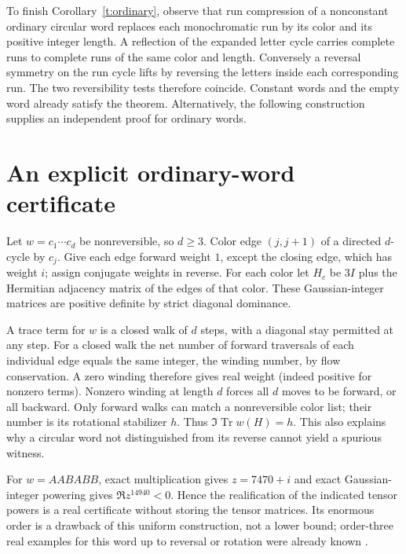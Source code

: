 \documentclass[11pt]{article}
\DeclareMathOperator{\Tr}{Tr}
\begin{document}
To finish Corollary~\ref{t:ordinary}, observe that run compression of a nonconstant ordinary circular word replaces each monochromatic run by its color and its positive integer length. A reflection of the expanded letter cycle carries complete runs to complete runs of the same color and length. Conversely a reversal symmetry on the run cycle lifts by reversing the letters inside each corresponding run. The two reversibility tests therefore coincide. Constant words and the empty word already satisfy the theorem. Alternatively, the following construction supplies an independent proof for ordinary words.

\section{An explicit ordinary-word certificate}

Let $w=c_1\cdots c_d$ be nonreversible, so $d\ge3$. Color edge $(j,j+1)$ of a directed $d$-cycle by $c_j$. Give each edge forward weight $1$, except the closing edge, which has weight $i$; assign conjugate weights in reverse. For each color let $H_c$ be $3I$ plus the Hermitian adjacency matrix of the edges of that color. These Gaussian-integer matrices are positive definite by strict diagonal dominance.

A trace term for $w$ is a closed walk of $d$ steps, with a diagonal stay permitted at any step. For a closed walk the net number of forward traversals of each individual edge equals the same integer, the winding number, by flow conservation. A zero winding therefore gives real weight (indeed positive for nonzero terms). Nonzero winding at length $d$ forces all $d$ moves to be forward, or all backward. Only forward walks can match a nonreversible color list; their number is its rotational stabilizer $h$. Thus $\Im\Tr w(H)=h$. This also explains why a circular word not distinguished from its reverse cannot yield a spurious witness.

For $w=AABABB$, exact multiplication gives $z=7470+i$ and exact Gaussian-integer powering gives $\Re z^{14940}<0$. Hence the realification of the indicated tensor powers is a real certificate without storing the tensor matrices. Its enormous order is a drawback of this uniform construction, not a lower bound; order-three real examples for this word up to reversal or rotation were already known \cite{HJ1}.
\end{document}
